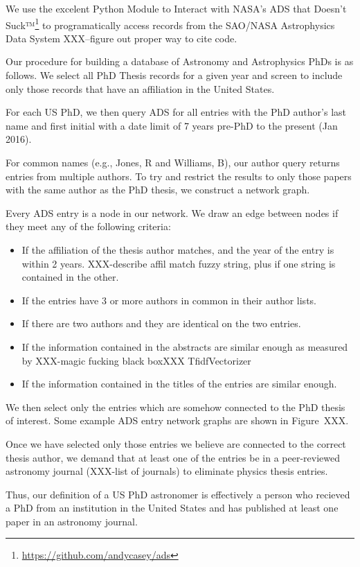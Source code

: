 \documentclass{emulateapj}
\begin{document}
We use the excelent Python Module to Interact with NASA's ADS that Doesn't Suck™\footnote{\url{https://github.com/andycasey/ads}} to programatically access records from the SAO/NASA Astrophysics Data System XXX--figure out proper way to cite code. 

Our procedure for building a database of Astronomy and Astrophysics PhDs is as follows.  We select all PhD Thesis records for a given year and screen to include only those records that have an affiliation in the United States.

For each US PhD, we then query ADS for all entries with the PhD author's last name and first initial with a date limit of 7 years pre-PhD to the present (Jan 2016).

For common names (e.g., Jones, R and Williams, B), our author query returns entries from multiple authors.  To try and restrict the results to only those papers with the same author as the PhD thesis, we construct a network graph.

Every ADS entry is a node in our network. We draw an edge between nodes if they meet any of the following criteria:
\begin{itemize}
\item{If the affiliation of the thesis author matches, and the year of the entry is within 2 years. XXX-describe affil match fuzzy string, plus if one string is contained in the other.}
\item{If the entries have 3 or more authors in common in their author lists.}
\item{If there are two authors and they are identical on the two entries.}
\item{If the information contained in the abstracts are similar enough as measured by XXX-magic fucking black boxXXX TfidfVectorizer}
  \item{If the information contained in the titles of the entries are similar enough.}
\end{itemize}

We then select only the entries which are somehow connected to the PhD thesis of interest.  Some example ADS entry network graphs are shown in Figure~XXX.

Once we have selected only those entries we believe are connected to the correct thesis author, we demand that at least one of the entries be in a peer-reviewed astronomy journal (XXX-list of journals) to eliminate physics thesis entries.

Thus, our definition of a US PhD astronomer is effectively a person who recieved a PhD from an institution in the United States and has published at least one paper in an astronomy journal.
\end{document}
